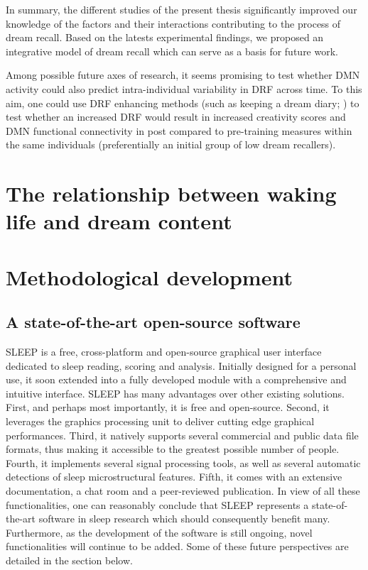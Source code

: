 In summary, the different studies of the present thesis significantly improved our knowledge of the factors and their interactions contributing to the process of dream recall. Based on the latests experimental findings, we proposed an integrative model of dream recall which can serve as a basis for future work.

Among possible future axes of research, it seems promising to test whether DMN activity could also predict intra-individual variability in DRF across time. To this aim, one could use DRF enhancing methods (such as keeping a dream diary; \citealp{schredl_questionnaires_2002}) to test whether an increased DRF would result in increased creativity scores and DMN functional connectivity in post compared to pre-training measures within the same individuals (preferentially an initial group of low dream recallers).

\cleardoublepage
\chapter{The relationship between waking life and dream content}
\label{disc:wle}

\cleardoublepage
\chapter{Methodological development}
\label{disc:methods}

\section{A state-of-the-art open-source software}
\label{disc:methods:software}

SLEEP is a free, cross-platform and open-source graphical user interface dedicated to sleep reading, scoring and analysis. Initially designed for a personal use, it soon extended into a fully developed module with a comprehensive and intuitive interface. SLEEP has many advantages over other existing solutions. First, and perhaps most importantly, it is free and open-source. Second, it leverages the graphics processing unit to deliver cutting edge graphical performances. Third, it natively supports several commercial and public data file formats, thus making it accessible to the greatest possible number of people. Fourth, it implements several signal processing tools, as well as several automatic detections of sleep microstructural features. Fifth, it comes with an extensive documentation, a chat room and a peer-reviewed publication. In view of all these functionalities, one can reasonably conclude that SLEEP represents a state-of-the-art software in sleep research which should consequently benefit many. Furthermore, as the development of the software is still ongoing, novel functionalities will continue to be added. Some of these future perspectives are detailed in the section below.

